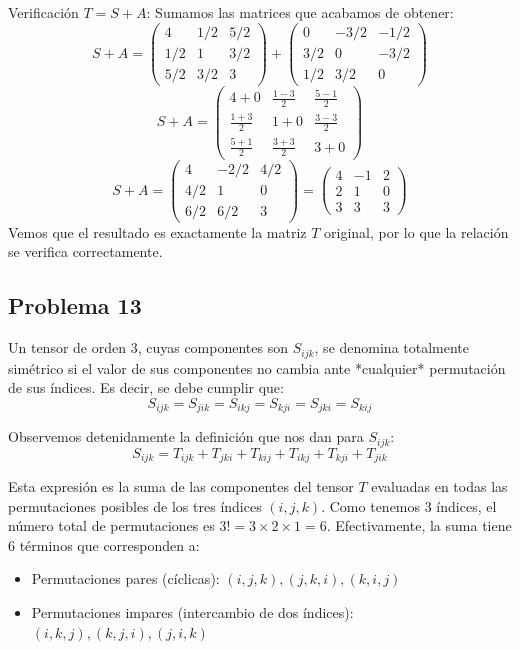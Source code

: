 \documentclass[11pt,spanish]{article}
\begin{document}
\begin{itemize}
Verificación $T = S + A$:
Sumamos las matrices que acabamos de obtener:
$$
S + A = \begin{pmatrix} 4 & 1/2 & 5/2 \\ 1/2 & 1 & 3/2 \\ 5/2 & 3/2 & 3 \end{pmatrix} + \begin{pmatrix} 0 & -3/2 & -1/2 \\ 3/2 & 0 & -3/2 \\ 1/2 & 3/2 & 0 \end{pmatrix}
$$
$$
S + A = \begin{pmatrix} 4+0 & \frac{1-3}{2} & \frac{5-1}{2} \\ \frac{1+3}{2} & 1+0 & \frac{3-3}{2} \\ \frac{5+1}{2} & \frac{3+3}{2} & 3+0 \end{pmatrix}
$$
$$
S + A = \begin{pmatrix} 4 & -2/2 & 4/2 \\ 4/2 & 1 & 0 \\ 6/2 & 6/2 & 3 \end{pmatrix} = \begin{pmatrix} 4 & -1 & 2 \\ 2 & 1 & 0 \\ 3 & 3 & 3 \end{pmatrix}
$$
Vemos que el resultado es exactamente la matriz $T$ original, por lo que la relación se verifica correctamente.

\end{itemize}

\subsection*{Problema 13}

Un tensor de orden 3, cuyas componentes son $S_{ijk}$, se denomina totalmente simétrico si el valor de sus componentes no cambia ante *cualquier* permutación de sus índices. Es decir, se debe cumplir que:
$$S_{ijk} = S_{jik} = S_{ikj} = S_{kji} = S_{jki} = S_{kij}$$

Observemos detenidamente la definición que nos dan para $S_{ijk}$:
$$S_{ijk} = T_{ijk} + T_{jki} + T_{kij} + T_{ikj} + T_{kji} + T_{jik}$$

Esta expresión es la suma de las componentes del tensor $T$ evaluadas en todas las permutaciones posibles de los tres índices $(i, j, k)$. Como tenemos 3 índices, el número total de permutaciones es $3! = 3 \times 2 \times 1 = 6$. Efectivamente, la suma tiene 6 términos que corresponden a:
\begin{itemize}
\item Permutaciones pares (cíclicas): $(i,j,k), (j,k,i), (k,i,j)$
\item Permutaciones impares (intercambio de dos índices): $(i,k,j), (k,j,i), (j,i,k)$
\end{itemize}
\end{document}
